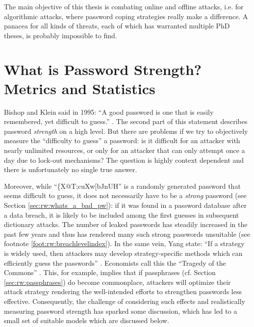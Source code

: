 

The main objective of this thesis is combating online and offline attacks, i.e. for algorithmic attacks, where password coping strategies really make a difference. A panacea for all kinds of threats, each of which has warranted multiple PhD theses, is probably impossible to find. 



\section{What is Password Strength? Metrics and Statistics}\label{sec:rw:pw_strength_metrics}
Bishop and Klein said in 1995: ``A good password is one that is easily remembered, yet difficult to guess.'' \cite[p. 231]{Bishop1995ProactivePasswordChecking}. The second part of this statement describes password \textit{strength} on a high level. But there are problems if we try to objectively measure the ``difficulty to guess'' a password: is it difficult for an attacker with nearly unlimited resources, or only for an attacker that can only attempt once a day due to lock-out mechanisms? The question is highly context dependent and there is unfortunately no single true answer. 

Moreover, while ``\{X@T;cuXw[bJnUH'' is a randomly generated password that seems difficult to guess, it does not necessarily have to be a \textit{strong} password (see Section \ref{sec:rw:whats_a_bad_pw}): if it was found in a password database after a data breach, it is likely to be included among the first guesses in subsequent dictionary attacks. The number of leaked passwords has steadily increased in the past few years and thus has rendered many such strong passwords unsuitable (see footnote \ref{foot:rw:breachlevelindex}). In the same vein, Yang \etal state: ``If a strategy is widely used, then attackers may develop strategy-specific methods which can efficiently guess the passwords'' \cite{Yang2016MnemonicSentenceBased}. Economists call this the ``Tragedy of the Commons'' \cite{Hardin1968TragedyCommons}. This, for example, implies that if passphrases (cf. Section \ref{sec:rw:passphrases}) do become commonplace, attackers will optimize their attack strategy rendering the well-intended efforts to strengthen passwords less effective. Consequently, the challenge of considering such effects and realistically measuring password strength has sparked some discussion, which has led to a small set of suitable models which are discussed below.


